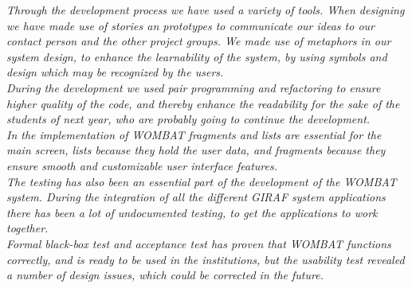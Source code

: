 \textit{Through the development process we have used a variety of tools.
When designing we have made use of stories an prototypes to communicate our ideas to our contact person and the other project groups.
We made use of metaphors in our system design, to enhance the learnability of the system, by using symbols and design which may be recognized by the users.}\\

\textit{During the development we used pair programming and refactoring to ensure higher quality of the code, and thereby enhance the readability for the sake of the students of next year, who are probably going to continue the development.}\\

\textit{In the implementation of WOMBAT fragments and lists are essential for the main screen, lists because they hold the user data, and fragments because they ensure smooth and customizable user interface features.}\\

\textit{The testing has also been an essential part of the development of the WOMBAT system.
During the integration of all the different GIRAF system applications there has been a lot of undocumented testing, to get the applications to work together.}\\

\textit{Formal black-box test and acceptance test has proven that WOMBAT functions correctly, and is ready to be used in the institutions, but the usability test revealed a number of design issues, which could be corrected in the future.}